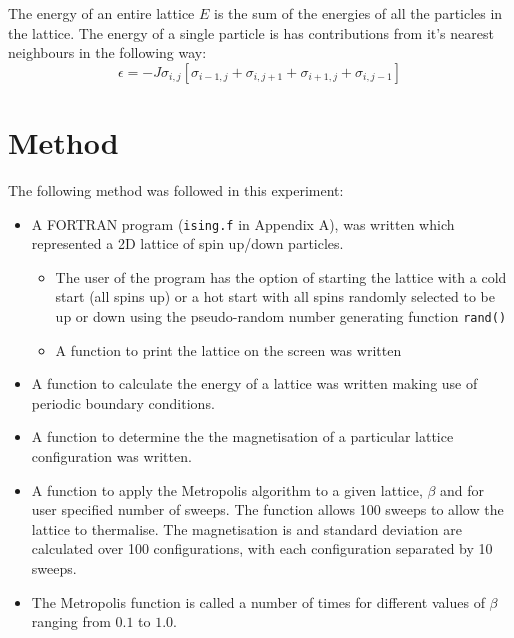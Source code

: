 \documentclass[a4paper]{IEEEtran}
\newcommand{\sg}[2]{\sigma_{#1,#2}}
\begin{document}
    The energy of an entire lattice $E$ is the sum of the energies
    of all the particles in the lattice. The energy of a single particle
    is has contributions from it's nearest neighbours in the following
    way:
    \[ \epsilon = -J \sg{i}{j} \left[ \sg{i-1}{j} +
                                      \sg{i}{j+1} +
                                      \sg{i+1}{j} +
                                      \sg{i}{j-1} \right] \]


\section{Method}
    The following method was followed in this experiment:
    \begin{itemize}
        \item A FORTRAN program (\texttt{ising.f} in Appendix A), was
              written which represented a 2D lattice of spin up/down 
              particles.
            \begin{itemize}
                \item The user of the program has the option of
                      starting the lattice with a cold start
                      (all spins up) or a hot start with all 
                      spins randomly selected to be up or down
                      using the pseudo-random number 
                      generating function \texttt{rand()} 
                \item A function to print the lattice on the screen
                      was written
            \end{itemize}
        \item A function to calculate the energy of a lattice was
              written making use of periodic boundary conditions.
        \item A function to determine the the magnetisation of 
              a particular lattice configuration was written.
        \item A function to apply the Metropolis algorithm to a given
              lattice, $\beta$ and for user specified number of sweeps.
              The function allows 100 sweeps to allow the lattice
              to thermalise.
              The magnetisation is and standard deviation are calculated
              over 100 configurations, with each configuration separated 
              by 10 sweeps.
        \item The Metropolis function is called a number of times
              for different values of $\beta$ ranging from $0.1$ 
              to $1.0$.
    \end{itemize}
\end{document}
